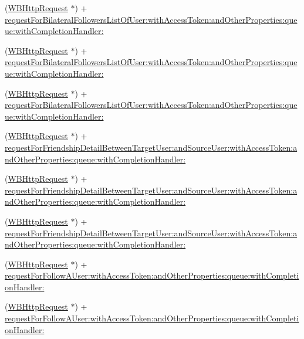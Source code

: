 \begin{DoxyCompactItemize}
\item 
(\mbox{\hyperlink{interface_w_b_http_request}{W\+B\+Http\+Request}} $\ast$) + \mbox{\hyperlink{interface_w_b_http_request_a5c4b501746e378232db99ae045e49889}{request\+For\+Bilateral\+Followers\+List\+Of\+User\+:with\+Access\+Token\+:and\+Other\+Properties\+:queue\+:with\+Completion\+Handler\+:}}
\item 
(\mbox{\hyperlink{interface_w_b_http_request}{W\+B\+Http\+Request}} $\ast$) + \mbox{\hyperlink{interface_w_b_http_request_a5c4b501746e378232db99ae045e49889}{request\+For\+Bilateral\+Followers\+List\+Of\+User\+:with\+Access\+Token\+:and\+Other\+Properties\+:queue\+:with\+Completion\+Handler\+:}}
\item 
(\mbox{\hyperlink{interface_w_b_http_request}{W\+B\+Http\+Request}} $\ast$) + \mbox{\hyperlink{interface_w_b_http_request_a5c4b501746e378232db99ae045e49889}{request\+For\+Bilateral\+Followers\+List\+Of\+User\+:with\+Access\+Token\+:and\+Other\+Properties\+:queue\+:with\+Completion\+Handler\+:}}
\item 
(\mbox{\hyperlink{interface_w_b_http_request}{W\+B\+Http\+Request}} $\ast$) + \mbox{\hyperlink{interface_w_b_http_request_a6e438b749b6311301808d7ae0923d7c3}{request\+For\+Friendship\+Detail\+Between\+Target\+User\+:and\+Source\+User\+:with\+Access\+Token\+:and\+Other\+Properties\+:queue\+:with\+Completion\+Handler\+:}}
\item 
(\mbox{\hyperlink{interface_w_b_http_request}{W\+B\+Http\+Request}} $\ast$) + \mbox{\hyperlink{interface_w_b_http_request_a6e438b749b6311301808d7ae0923d7c3}{request\+For\+Friendship\+Detail\+Between\+Target\+User\+:and\+Source\+User\+:with\+Access\+Token\+:and\+Other\+Properties\+:queue\+:with\+Completion\+Handler\+:}}
\item 
(\mbox{\hyperlink{interface_w_b_http_request}{W\+B\+Http\+Request}} $\ast$) + \mbox{\hyperlink{interface_w_b_http_request_a6e438b749b6311301808d7ae0923d7c3}{request\+For\+Friendship\+Detail\+Between\+Target\+User\+:and\+Source\+User\+:with\+Access\+Token\+:and\+Other\+Properties\+:queue\+:with\+Completion\+Handler\+:}}
\item 
(\mbox{\hyperlink{interface_w_b_http_request}{W\+B\+Http\+Request}} $\ast$) + \mbox{\hyperlink{interface_w_b_http_request_a857eebccc3b26b8d7c5bbc38a3ae2627}{request\+For\+Follow\+A\+User\+:with\+Access\+Token\+:and\+Other\+Properties\+:queue\+:with\+Completion\+Handler\+:}}
\item 
(\mbox{\hyperlink{interface_w_b_http_request}{W\+B\+Http\+Request}} $\ast$) + \mbox{\hyperlink{interface_w_b_http_request_a857eebccc3b26b8d7c5bbc38a3ae2627}{request\+For\+Follow\+A\+User\+:with\+Access\+Token\+:and\+Other\+Properties\+:queue\+:with\+Completion\+Handler\+:}}

\end{DoxyCompactItemize}
